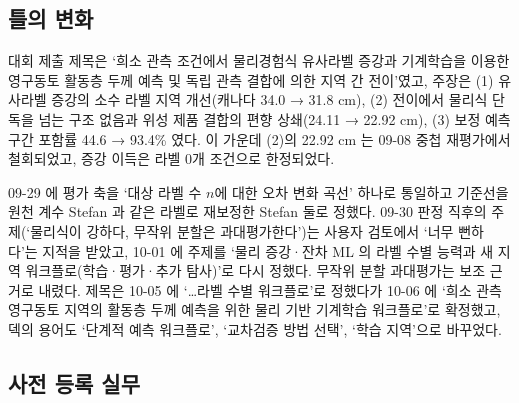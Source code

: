 \subsection{틀의 변화}

대회 제출 제목은 ‘희소 관측 조건에서 물리경험식 유사라벨 증강과 기계학습을 이용한 영구동토 활동층 두께 예측 및 독립 관측 결합에 의한 지역 간 전이’였고, 주장은 (1) 유사라벨 증강의 소수 라벨 지역 개선(캐나다 34.0 → 31.8 cm), (2) 전이에서 물리식 단독을 넘는 구조 없음과 위성 제품 결합의 편향 상쇄(24.11 → 22.92 cm), (3) 보정 예측구간 포함률 44.6 → 93.4\% 였다. 이 가운데 (2)의 22.92 cm 는 09-08 중첩 재평가에서 철회되었고, 증강 이득은 라벨 0개 조건으로 한정되었다.

09-29 에 평가 축을 ‘대상 라벨 수 $n$에 대한 오차 변화 곡선’ 하나로 통일하고 기준선을 원천 계수 Stefan 과 같은 라벨로 재보정한 Stefan 둘로 정했다. 09-30 판정 직후의 주제(‘물리식이 강하다, 무작위 분할은 과대평가한다’)는 사용자 검토에서 ‘너무 뻔하다’는 지적을 받았고, 10-01 에 주제를 ‘물리 증강·잔차 ML 의 라벨 수별 능력과 새 지역 워크플로(학습·평가·추가 탐사)’로 다시 정했다. 무작위 분할 과대평가는 보조 근거로 내렸다. 제목은 10-05 에 ‘…라벨 수별 워크플로’로 정했다가 10-06 에 ‘희소 관측 영구동토 지역의 활동층 두께 예측을 위한 물리 기반 기계학습 워크플로’로 확정했고, 덱의 용어도 ‘단계적 예측 워크플로’, ‘교차검증 방법 선택’, ‘학습 지역’으로 바꾸었다.

\subsection{사전 등록 실무}

